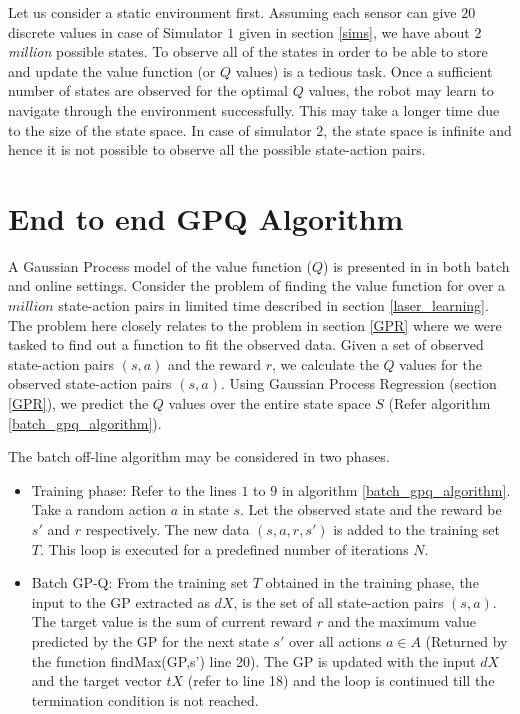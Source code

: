 \documentclass[12pt]{report}
\begin{document}
Let us consider a static environment first. Assuming each sensor can give $20$ discrete values in case of Simulator $1$ given in section \ref{sims}, we have about $2$ \textit{million} possible states. To observe all of the states in order to be able to store and update the value function (or $Q$ values) is a tedious task. Once a sufficient number of states are observed for the optimal $Q$ values, the robot may learn to navigate through the environment successfully. This may take a longer time due to the size of the state space. In case of simulator $2$, the state space is infinite and hence it is not possible to observe all the possible state-action pairs. 

\section{End to end GPQ Algorithm}
 A Gaussian Process model of the value function ($Q$) is presented in \cite{chowdhary2014off} in both batch and online settings. Consider the problem of finding the value function for over a $million$ state-action pairs in limited time described in section \ref{laser_learning}. The problem here closely relates to the problem in section \ref{GPR} where we were tasked to find out a function to fit the observed data. Given a set of observed state-action pairs $(s,a)$ and the reward $r$, we calculate the $Q$ values for the observed state-action pairs $(s,a)$. Using Gaussian Process Regression (section \ref{GPR}), we predict the $Q$ values over the entire state space $S$ (Refer algorithm \ref{batch_gpq_algorithm}).\par
 The batch off-line algorithm may be considered in two phases.
 \begin{itemize}
\item Training phase: Refer to the lines $1$ to $9$ in algorithm \ref{batch_gpq_algorithm}. Take a random action $a$ in state $s$. Let the observed state and the reward be $s'$ and $r$ respectively. The new data $(s,a,r,s')$ is added to the training set $T$. This loop is executed for a predefined number of iterations $N$.
\item Batch GP-Q: From the training set $T$ obtained in the training phase, the input to the GP extracted as $dX$, is the set of all state-action pairs $(s,a)$. The target value is the sum of current reward $r$ and the maximum value predicted by the GP for the next state $s'$ over all actions $a \in A$ (Returned by the function findMax(GP,s') line 20). The GP is updated with the input $dX$ and the target vector $tX$ (refer to line 18) and the loop is continued till the termination condition is not reached.
\end{itemize}
\end{document}
